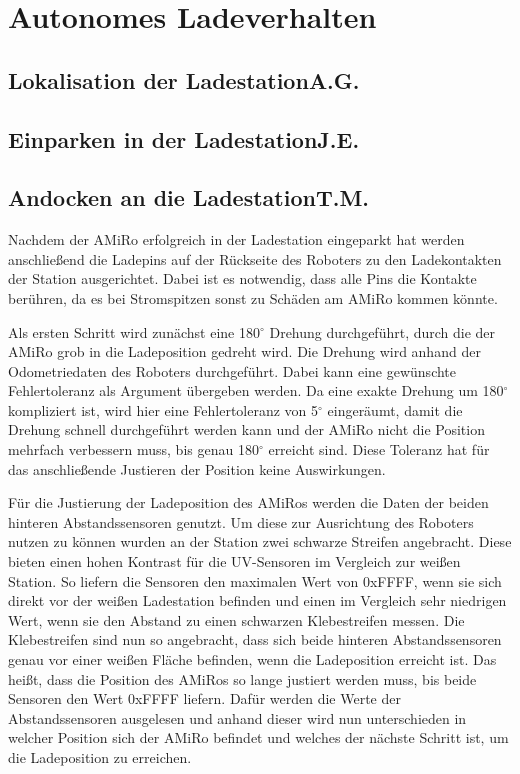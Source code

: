 \chapter{Autonomes Ladeverhalten} \label{kap:AutonomesLadeverhalten}

\section[Lokalisation der Ladestation]{Lokalisation der Ladestation\hfill {\normalsize A.G.}} %

\section[Einparken in der Ladestation]{Einparken in der Ladestation\hfill {\normalsize J.E.}} %

\section[Andocken an die Ladestation]{Andocken an die Ladestation\hfill {\normalsize T.M.}} %
Nachdem der AMiRo erfolgreich in der Ladestation eingeparkt hat werden anschließend die Ladepins auf der Rückseite des Roboters zu den Ladekontakten der Station ausgerichtet. Dabei ist es notwendig, dass alle Pins die Kontakte berühren, da es bei Stromspitzen sonst zu Schäden am AMiRo kommen könnte.

Als ersten Schritt wird zunächst eine 180$^\circ$ Drehung durchgeführt, durch die der AMiRo grob in die Ladeposition gedreht wird. Die Drehung wird anhand der Odometriedaten des Roboters durchgeführt. Dabei kann eine gewünschte Fehlertoleranz als Argument übergeben werden. Da eine exakte Drehung um 180$^\circ$ kompliziert ist, wird hier eine Fehlertoleranz von 5$^\circ$ eingeräumt, damit die Drehung schnell durchgeführt werden kann und der AMiRo nicht die Position mehrfach verbessern muss, bis genau 180$^\circ$ erreicht sind. Diese Toleranz hat für das anschließende Justieren der Position keine Auswirkungen.

Für die Justierung der Ladeposition des AMiRos werden die Daten der beiden hinteren Abstandssensoren genutzt. Um diese zur Ausrichtung des Roboters nutzen zu können wurden an der Station zwei schwarze Streifen angebracht. Diese bieten einen hohen Kontrast für die UV-Sensoren im Vergleich zur weißen Station. So liefern die Sensoren den maximalen Wert von 0xFFFF, wenn sie sich direkt vor der weißen Ladestation befinden und einen im Vergleich sehr niedrigen Wert, wenn sie den Abstand zu einen schwarzen Klebestreifen messen. 
Die Klebestreifen sind nun so angebracht, dass sich beide hinteren Abstandssensoren genau vor einer weißen Fläche befinden, wenn die Ladeposition erreicht ist. 
Das heißt, dass die Position des AMiRos so lange justiert werden muss, bis beide Sensoren den Wert 0xFFFF liefern. 
Dafür werden die Werte der Abstandssensoren ausgelesen und anhand dieser wird nun unterschieden in welcher Position sich der AMiRo befindet und welches der nächste Schritt ist, um die Ladeposition zu erreichen. 

